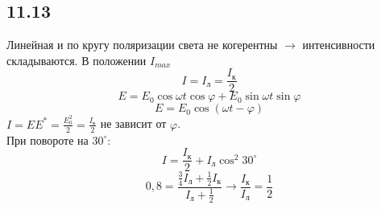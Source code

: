 \subsection*{11.13}
Линейная и по кругу поляризации света не когерентны $\rightarrow$ интенсивности складываются. В положении $I_{max}$
$$I = I_л = \frac{I_к}{2}$$
$$E = E_0 \cos \omega t \cos \varphi + E_0 \sin \omega t \sin \varphi$$
$$E = E_0 \cos(\omega t - \varphi)$$
$I = E E^* = \frac{E_0^2}{2} = \frac{I_к}{2}$ не зависит от $\varphi$.\\
При повороте на $30^{\circ}$:
$$I = \frac{I_к}{2} + I_л \cos^2 30^{\circ}$$
$$0,8 = \frac{\frac{3}{4}I_л + \frac{1}{2} I_к}{I_л + \frac{1}{2}} \rightarrow \frac{I_к}{I_л} = \frac{1}{2}$$